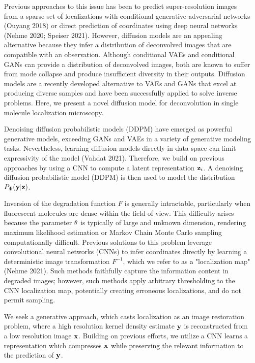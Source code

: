 \documentclass{article}
\begin{document}
Previous approaches to this issue has been to predict super-resolution images from a sparse set of localizations with conditional generative adversarial networks (Ouyang 2018) or direct prediction of coordinates using deep neural networks (Nehme 2020; Speiser 2021). However, diffusion models are an appealing alternative because they infer a distribution of deconvolved images that are compatible with an observation. Although conditional VAEs and conditional GANs can provide a distribution of deconvolved images, both are known to suffer from mode collapse and produce insufficient diversity in their outputs. Diffusion models are a recently developed alternative to VAEs and GANs that excel at producing diverse samples and have been successfully applied to solve inverse problems. Here, we present a novel diffusion model for deconvolution in single molecule localization microscopy.

Denoising diffusion probabilistic models (DDPM) have emerged as powerful generative models, exceeding GANs and VAEs in a variety of generative modeling tasks. Nevertheless, learning diffusion models directly in data space can limit expressivity of the model (Vahdat 2021). Therefore, we build on previous approaches by using a CNN to compute a latent representation $\bold{z}_{i}$. A denoising diffusion probabilistic model (DDPM) is then used to model the distribution $P_{\Phi}(\bold{y}|\bold{z})$. 

Inversion of the degradation function $F$ is generally intractable, particularly when fluorescent molecules are dense within the field of view. This difficulty arises because the parameter $\bold{\theta}$ is typically of large and unknown dimension, rendering maximum likelihood estimation or Markov Chain Monte Carlo sampling computationally difficult. Previous solutions to this problem leverage convolutional neural networks (CNNs) to infer coordinates directly by learning a deterministic image transformation $F^{-1}$, which we refer to as a "localization map" (Nehme 2021). Such methods faithfully capture the information content in degraded images; however, such methods apply arbitrary thresholding to the CNN localization map, potentially creating erroneous localizations, and do not permit sampling. 

We seek a generative approach, which casts localization as an image restoration problem, where a high resolution kernel density estimate $\bold{y}$ is reconstructed from a low resolution image $\bold{x}$. Building on previous efforts, we utilize a CNN learns a representation which compresses $\bold{x}$ while preserving the relevant information to the prediction of $\bold{y}$. 
\end{document}
